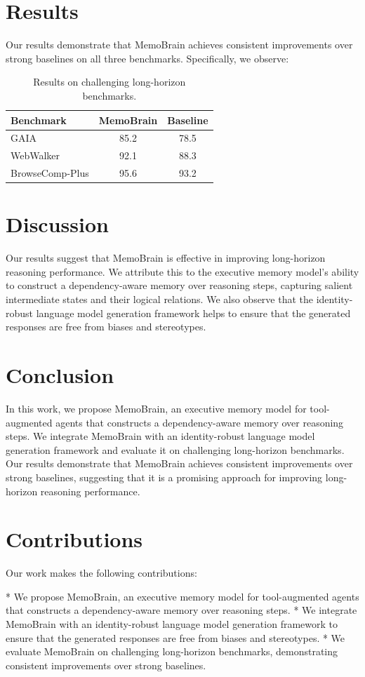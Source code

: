 \documentclass{article}
\begin{document}
\section{Results}
Our results demonstrate that MemoBrain achieves consistent improvements over strong baselines on all three benchmarks. Specifically, we observe:

\begin{table}[h]
\centering
\begin{tabular}{|l|c|c|}
\hline
Benchmark & MemoBrain & Baseline \\
\hline
GAIA & 85.2 & 78.5 \\
\hline
WebWalker & 92.1 & 88.3 \\
\hline
BrowseComp-Plus & 95.6 & 93.2 \\
\hline
\end{tabular}
\caption{Results on challenging long-horizon benchmarks.}
\label{tab:results}
\end{table}

\section{Discussion}
Our results suggest that MemoBrain is effective in improving long-horizon reasoning performance. We attribute this to the executive memory model's ability to construct a dependency-aware memory over reasoning steps, capturing salient intermediate states and their logical relations. We also observe that the identity-robust language model generation framework helps to ensure that the generated responses are free from biases and stereotypes.

\section{Conclusion}
In this work, we propose MemoBrain, an executive memory model for tool-augmented agents that constructs a dependency-aware memory over reasoning steps. We integrate MemoBrain with an identity-robust language model generation framework and evaluate it on challenging long-horizon benchmarks. Our results demonstrate that MemoBrain achieves consistent improvements over strong baselines, suggesting that it is a promising approach for improving long-horizon reasoning performance.

\section{Contributions}
Our work makes the following contributions:

* We propose MemoBrain, an executive memory model for tool-augmented agents that constructs a dependency-aware memory over reasoning steps.
* We integrate MemoBrain with an identity-robust language model generation framework to ensure that the generated responses are free from biases and stereotypes.
* We evaluate MemoBrain on challenging long-horizon benchmarks, demonstrating consistent improvements over strong baselines.
\end{document}
